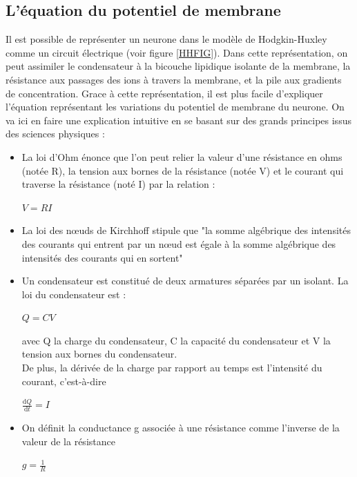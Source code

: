 \documentclass[12pt]{scrartcl}
\newcommand{\dd}{\mathrm{d}}
\begin{document}
\subsection{L'équation du potentiel de membrane} \label{HHEQPOT}
Il est possible de représenter un neurone dans le modèle de Hodgkin-Huxley comme un circuit électrique (voir figure \ref{HHFIG}). Dans cette représentation, on peut assimiler le condensateur à la bicouche lipidique isolante de la membrane, la résistance aux passages des ions à travers la membrane, et la pile aux gradients de concentration. Grace à cette représentation, il est plus facile d'expliquer l'équation représentant les variations du potentiel de membrane du neurone. On va ici en faire une explication intuitive en se basant sur des grands principes issus des sciences physiques :\\
\begin{itemize}
\item La loi d'Ohm énonce que l'on peut relier la valeur d'une résistance en ohms (notée R), la tension aux bornes de la résistance (notée V) et le courant qui traverse la résistance (noté I) par la relation : \begin{center}$ V = RI $\end{center}
\item La loi des nœuds de Kirchhoff stipule que "la somme algébrique des intensités des courants qui entrent par un nœud est égale à la somme algébrique des intensités des courants qui en sortent"
\item Un condensateur est constitué de deux armatures séparées par un isolant. La loi du condensateur est : \begin{center} $Q = CV$ \end{center} avec Q la charge du condensateur, C la capacité du condensateur et V la tension aux bornes du condensateur. \\ De plus, la dérivée de la charge par rapport au temps est l'intensité du courant, c'est-à-dire \begin{center}$\displaystyle \frac{\dd Q}{\dd t} = I $ \end{center}
\item On définit la conductance g associée à une résistance comme l'inverse de la valeur de la résistance \begin{center} $g = \displaystyle \frac{1}{R}$ \end{center}
\end{itemize}
\end{document}
